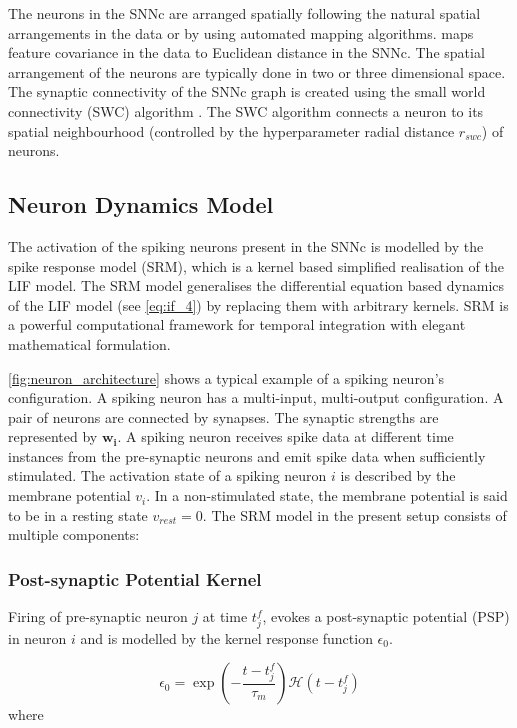 The neurons in the SNNc are arranged spatially following the natural spatial arrangements in the data or by using automated mapping algorithms. \citet{tu2017mapping} maps feature covariance in the data to Euclidean distance in the SNNc. The spatial arrangement of the neurons are typically done in two or three dimensional space. The synaptic connectivity of the SNNc graph is created using the small world connectivity (SWC) algorithm \citep{kasabov2014evolving, tu2014neucube}. The SWC algorithm connects a neuron to its spatial neighbourhood (controlled by the hyperparameter radial distance $r_{swc}$) of neurons.   

\subsection{Neuron Dynamics Model}
\label{subsec:SNNc_neuron_model}

The activation of the spiking neurons present in the SNNc is modelled by the spike response model (SRM), which is a kernel based simplified realisation of the LIF model. The SRM model generalises the differential equation based dynamics of the LIF model (see \equationname \ref{eq:if_4}) by replacing them with arbitrary kernels. SRM is a powerful computational framework for temporal integration with elegant mathematical formulation.

\figurename \ref{fig:neuron_architecture} shows a typical example of a spiking neuron's configuration. A spiking neuron has a multi-input, multi-output configuration. A pair of neurons are connected by synapses. The synaptic strengths are represented by $\mathbf{w_i}$. A spiking neuron receives spike data at different time instances from the pre-synaptic neurons and emit spike data when sufficiently stimulated. The activation state of a spiking neuron $i$ is described by the membrane potential $v_i$. In a non-stimulated state, the membrane potential is said to be in a resting state $v_{rest}=0$. The SRM model in the present setup consists of multiple components:

\subsubsection{Post-synaptic Potential Kernel}
Firing of pre-synaptic neuron $j$ at time $t_j^f$, evokes a post-synaptic potential (PSP) in neuron $i$ and is modelled by the kernel response function $\epsilon_0$. 

\begin{equation}
\epsilon_0=\exp(-\frac{t-t_j^f}{\tau_m})\mathcal{H}(t-t_j^f)
\label{eq:PSP}
\end{equation}
where 


